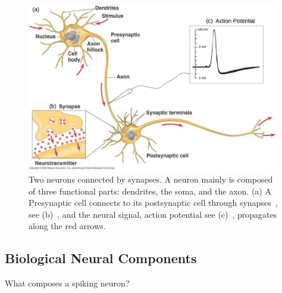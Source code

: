 	\begin{figure}[bt]
		\centering
		\includegraphics[width=0.98\textwidth]{pics_snn/neuron2.png}
		\caption{Two neurons connected by synapses. 
			A neuron mainly is composed of three functional parts: dendrites, the soma, and the axon. (a) A Presynaptic cell connects to its postsynaptic cell through synapses~\cite{reece2011campbell}, see (b)~\cite{reece2011campbell}, and the neural signal, action potential see (c)~\cite{hodgkin1939action}, propagates along the red arrows. }
		\label{Fig:neuron_basic}
	\end{figure}

\subsection{Biological Neural Components}
What composes a spiking neuron?
%

